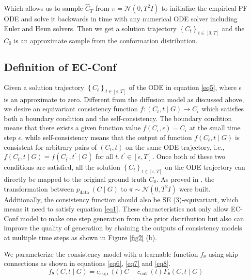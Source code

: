 \documentclass{article} %
\begin{document}
Which allows us to sample $\widehat{C}_T$ from $\pi=\mathcal{N}\left(0, T^2 I\right)$ to initialize the empirical PF ODE and solve it backwards in time with any numerical ODE solver including Euler and Heun solvers. Then we get a solution trajectory $\left\{C_t\right\}_{t \in[0, T]}$ and the $\widehat{C}_0$ is an approximate sample from the conformation distribution. 


\subsection{Definition of EC-Conf}
Given a solution trajectory  $\left\{C_t\right\}_{t \in[\epsilon, T]}$ of the ODE in equation \ref{eq5}, where $\epsilon$ is an approximate to zero. Different from the diffusion model as discussed above, we desire an equivariant consistency function $f:\left(C_t, t \mid G\right) \rightarrow C_\epsilon$ which satisfies both a boundary condition and the self-consistency. The boundary condition means that there exists a given function value $f\left(C_\epsilon, \epsilon\right)=C_\epsilon$ at the small time step $\epsilon$, while self-consistency means that the output of function $f\left(C_t, t \mid G\right)$ is consistent for arbitrary pairs of $\left(C_t, t\right)$ on the same ODE trajectory, i.e., $f\left(C_t, t \mid G\right)=f\left(C_{t^{\prime}}, t^{\prime} \mid G\right)$ for all $t, t^{\prime} \in[\epsilon, T]$. Once both of these two conditions are satisfied, all the solution $\left\{C_t\right\}_{t \in[\epsilon, T]}$ on the ODE trajectory can directly be mapped to the original ground truth $C_0$. As proved in \cite{song2023consistency}, the transformation between $p_{\text {data }}(C \mid G)$ to $\pi \sim \mathcal{N}\left(0, T^2 I\right)$ were built. Additionally, the consistency function should also be SE (3)-equivariant, which means it need to satisfy equation \ref{eq1}. These characteristics not only allow EC-Conf model to make one step generation from the prior distribution but also can improve the quality of generation by chaining the outputs of consistency models at multiple time steps as shown in Figure \ref{fig2} (b).




We parameterize the consistency model with a learnable function $f_\theta$ using skip connections as shown in equations \ref{eq6}, \ref{eq7} and \ref{eq8}.
\begin{equation}
	f_\theta(C, t \mid G)=c_{\text {skip }}(t) C+c_{\text {out }}(t) F_\theta(C, t \mid G)
	\label{eq6}
\end{equation}
\end{document}
